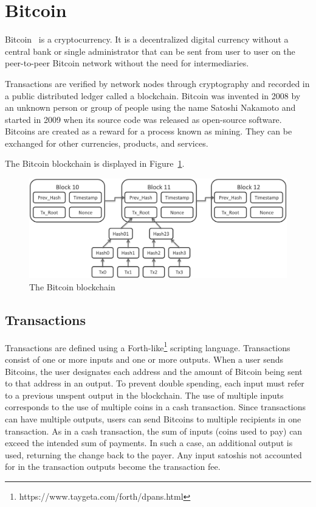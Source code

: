 \section{Bitcoin}

Bitcoin~\cite{nakamoto} is a cryptocurrency. It is a decentralized digital
currency without a central bank or single administrator that can be sent from
user to user on the peer-to-peer Bitcoin network without the need for
intermediaries.

Transactions are verified by network nodes through cryptography and recorded in
a public distributed ledger called a blockchain. Bitcoin was invented in 2008
by an unknown person or group of people using the name Satoshi Nakamoto and
started in 2009 when its source code was released as open-source software.
Bitcoins are created as a reward for a process known as mining. They can be
exchanged for other currencies, products, and services.

The Bitcoin blockchain is displayed in Figure~\ref{fig:Bitcoin-blockchain}.

\begin{figure}[H]
  \begin{center}
    \includegraphics[width=0.6\columnwidth]{images/Bitcoin-blockchain.png}
  \end{center}
  \caption{The Bitcoin blockchain}
  \label{fig:Bitcoin-blockchain}
\end{figure}

\subsection{Transactions}

Transactions are defined using a
Forth-like\footnote{https://www.taygeta.com/forth/dpans.html} scripting
language. Transactions consist of one or more inputs and one or more outputs.
When a user sends Bitcoins, the user designates each address and the amount of
Bitcoin being sent to that address in an output. To prevent double spending,
each input must refer to a previous unspent output in the blockchain. The use
of multiple inputs corresponds to the use of multiple coins in a cash
transaction. Since transactions can have multiple outputs, users can send
Bitcoins to multiple recipients in one transaction. As in a cash transaction,
the sum of inputs (coins used to pay) can exceed the intended sum of payments.
In such a case, an additional output is used, returning the change back to the
payer. Any input satoshis not accounted for in the transaction outputs become
the transaction fee.

